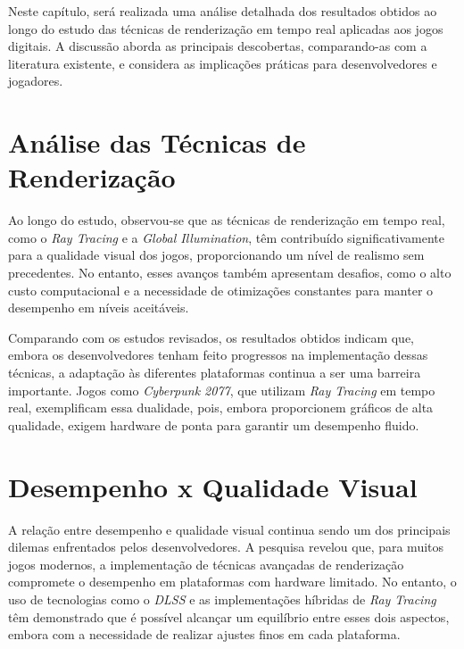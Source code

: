 \makeatletter
\renewcommand{\chapter}{%
  \if@openright\cleardoublepage\else\clearpage\fi %
  \secdef{\@chapter}{\@schapter}}
\makeatother
\chapter{Discussão dos Resultados}

Neste capítulo, será realizada uma análise detalhada dos resultados obtidos ao longo do estudo das técnicas de renderização em tempo real aplicadas aos jogos digitais. A discussão aborda as principais descobertas, comparando-as com a literatura existente, e considera as implicações práticas para desenvolvedores e jogadores.

\section{Análise das Técnicas de Renderização}
Ao longo do estudo, observou-se que as técnicas de renderização em tempo real, como o \textit{Ray Tracing} e a \textit{Global Illumination}, têm contribuído significativamente para a qualidade visual dos jogos, proporcionando um nível de realismo sem precedentes. No entanto, esses avanços também apresentam desafios, como o alto custo computacional e a necessidade de otimizações constantes para manter o desempenho em níveis aceitáveis.

Comparando com os estudos revisados, os resultados obtidos indicam que, embora os desenvolvedores tenham feito progressos na implementação dessas técnicas, a adaptação às diferentes plataformas continua a ser uma barreira importante. Jogos como \textit{Cyberpunk 2077}, que utilizam \textit{Ray Tracing} em tempo real, exemplificam essa dualidade, pois, embora proporcionem gráficos de alta qualidade, exigem hardware de ponta para garantir um desempenho fluido.

\section{Desempenho x Qualidade Visual}
A relação entre desempenho e qualidade visual continua sendo um dos principais dilemas enfrentados pelos desenvolvedores. A pesquisa revelou que, para muitos jogos modernos, a implementação de técnicas avançadas de renderização compromete o desempenho em plataformas com hardware limitado. No entanto, o uso de tecnologias como o \textit{DLSS} e as implementações híbridas de \textit{Ray Tracing} têm demonstrado que é possível alcançar um equilíbrio entre esses dois aspectos, embora com a necessidade de realizar ajustes finos em cada plataforma.


